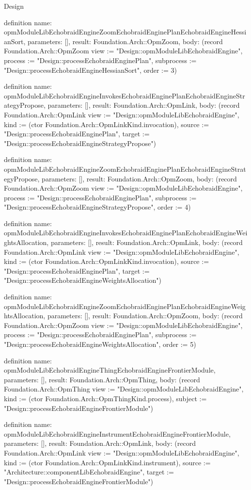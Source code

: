 \begin{lexlean}{Design}
\begin{semanticmodule}
definition{
  name: opmModuleLibEchobraidEngineZoomEchobraidEnginePlanEchobraidEngineHessianSort,
  parameters: [],
  result: Foundation.Arch::OpmZoom,
  body: (record Foundation.Arch::OpmZoom {view := "Design::opmModuleLibEchobraidEngine", process := "Design::processEchobraidEnginePlan", subprocess := "Design::processEchobraidEngineHessianSort", order := 3})
}

definition{
  name: opmModuleLibEchobraidEngineInvokesEchobraidEnginePlanEchobraidEngineStrategyPropose,
  parameters: [],
  result: Foundation.Arch::OpmLink,
  body: (record Foundation.Arch::OpmLink {view := "Design::opmModuleLibEchobraidEngine", kind := (ctor Foundation.Arch::OpmLinkKind.invocation), source := "Design::processEchobraidEnginePlan", target := "Design::processEchobraidEngineStrategyPropose"})
}

definition{
  name: opmModuleLibEchobraidEngineZoomEchobraidEnginePlanEchobraidEngineStrategyPropose,
  parameters: [],
  result: Foundation.Arch::OpmZoom,
  body: (record Foundation.Arch::OpmZoom {view := "Design::opmModuleLibEchobraidEngine", process := "Design::processEchobraidEnginePlan", subprocess := "Design::processEchobraidEngineStrategyPropose", order := 4})
}

definition{
  name: opmModuleLibEchobraidEngineInvokesEchobraidEnginePlanEchobraidEngineWeightsAllocation,
  parameters: [],
  result: Foundation.Arch::OpmLink,
  body: (record Foundation.Arch::OpmLink {view := "Design::opmModuleLibEchobraidEngine", kind := (ctor Foundation.Arch::OpmLinkKind.invocation), source := "Design::processEchobraidEnginePlan", target := "Design::processEchobraidEngineWeightsAllocation"})
}

definition{
  name: opmModuleLibEchobraidEngineZoomEchobraidEnginePlanEchobraidEngineWeightsAllocation,
  parameters: [],
  result: Foundation.Arch::OpmZoom,
  body: (record Foundation.Arch::OpmZoom {view := "Design::opmModuleLibEchobraidEngine", process := "Design::processEchobraidEnginePlan", subprocess := "Design::processEchobraidEngineWeightsAllocation", order := 5})
}

definition{
  name: opmModuleLibEchobraidEngineThingEchobraidEngineFrontierModule,
  parameters: [],
  result: Foundation.Arch::OpmThing,
  body: (record Foundation.Arch::OpmThing {view := "Design::opmModuleLibEchobraidEngine", kind := (ctor Foundation.Arch::OpmThingKind.process), subject := "Design::processEchobraidEngineFrontierModule"})
}

definition{
  name: opmModuleLibEchobraidEngineInstrumentEchobraidEngineFrontierModule,
  parameters: [],
  result: Foundation.Arch::OpmLink,
  body: (record Foundation.Arch::OpmLink {view := "Design::opmModuleLibEchobraidEngine", kind := (ctor Foundation.Arch::OpmLinkKind.instrument), source := "Architecture::componentLibEchobraidEngine", target := "Design::processEchobraidEngineFrontierModule"})
}


\end{semanticmodule}
\end{lexlean}
